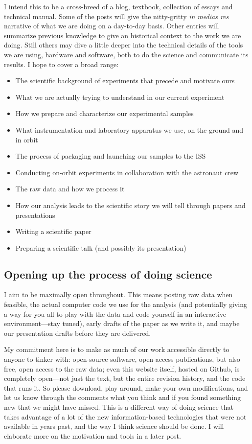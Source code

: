 I intend this to be a cross-breed of a blog, textbook, collection of essays and
technical manual. Some of the posts will give the nitty-gritty \emph{in medias
res} narrative of what we are doing on a day-to-day basis. Other entries will
summarize previous knowledge to give an historical context to the work we are
doing. Still others may dive a little deeper into the technical details of the
tools we are using, hardware and software, both to do the science and
communicate its results. I hope to cover a broad range:
\begin{itemize}
\item The scientific background of experiments that precede and motivate ours
\item What we are actually trying to understand in our current experiment
\item How we prepare and characterize our experimental samples
\item What instrumentation and laboratory apparatus we use, on the ground and in orbit
\item The process of packaging and launching our samples to the ISS
\item Conducting on-orbit experiments in collaboration with the astronaut crew
\item The raw data and how we process it
\item How our analysis leads to the scientific story we will tell through papers and presentations
\item Writing a scientific paper
\item Preparing a scientific talk (and possibly its presentation)
\end{itemize}

\subsection{Opening up the process of doing science}\label{opening-up-the-process-of-doing-science}
I aim to be maximally open throughout. This means posting raw data when
feasible, the actual computer code we use for the analysis (and potentially
giving a way for you all to play with the data and code yourself in an
interactive environment---stay tuned), early drafts of the paper as we write it,
and maybe our presentation drafts before they are delivered.

My commitment here is to make as much of our work accessible directly to anyone
to tinker with: open-source software, open-access publications, but also free,
open access to the raw data; even this website itself, hosted on Github, is
completely open---not just the text, but the entire revision history, and the
code that runs it. So please download, play around, make your own modifications,
and let us know through the comments what you think and if you found something
new that we might have missed. This is a different way of doing science that
takes advantage of a lot of the new information-based technologies that were not
available in years past, and the way I think science should be done. I will
elaborate more on the motivation and tools in a later post.
